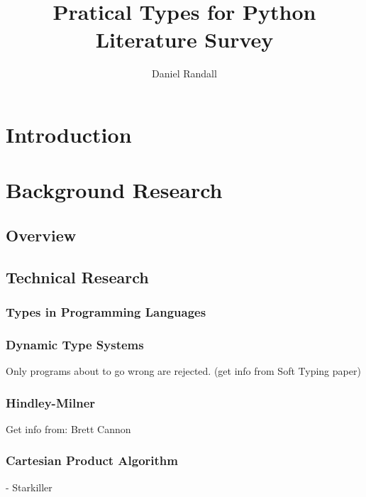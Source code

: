 \documentclass[12pt, titlepage]{article}
\title{Pratical Types for Python \\ Literature Survey}
\author{Daniel Randall}
\date{}
\begin{document}
\maketitle

\tableofcontents
\newpage

\section{Introduction}


\section{Background Research}
\subsection{Overview}


\subsection{Technical Research}

\subsubsection*{Types in Programming Languages}

\subsubsection*{Dynamic Type Systems}
Only programs about to go wrong are rejected. (get info from Soft Typing paper)

\subsubsection*{Hindley-Milner}

Get info from:
Brett Cannon	

\subsubsection*{Cartesian Product Algorithm}
- Starkiller
\end{document}
